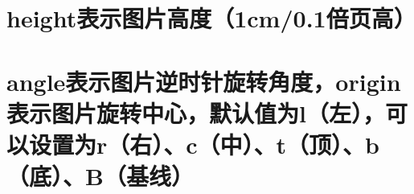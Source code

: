 \documentclass{article}
\begin{document}

\section{height表示图片高度（1cm/0.1倍页高）}

\section{angle表示图片逆时针旋转角度，origin表示图片旋转中心，默认值为l（左），可以设置为r（右）、c（中）、t（顶）、b（底）、B（基线）}
\end{document}
